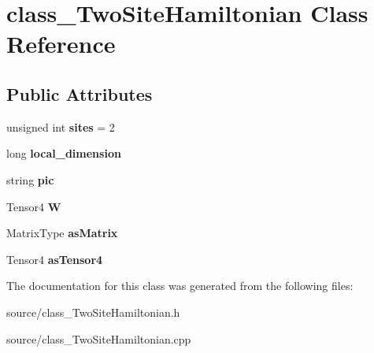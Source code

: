 \hypertarget{classclass___two_site_hamiltonian}{}\section{class\+\_\+\+Two\+Site\+Hamiltonian Class Reference}
\label{classclass___two_site_hamiltonian}
\subsection*{Public Attributes}
\begin{DoxyCompactItemize}
\item 
unsigned int {\bfseries sites} = 2\hypertarget{classclass___two_site_hamiltonian_a335dfa2f3998b5ae32ea04fbe7fd9bd7}{}\label{classclass___two_site_hamiltonian_a335dfa2f3998b5ae32ea04fbe7fd9bd7}

\item 
long {\bfseries local\+\_\+dimension}\hypertarget{classclass___two_site_hamiltonian_aeb12dabc056b052477430c47f8b1ebed}{}\label{classclass___two_site_hamiltonian_aeb12dabc056b052477430c47f8b1ebed}

\item 
string {\bfseries pic}\hypertarget{classclass___two_site_hamiltonian_a77f629e9366b73ddc2b76a0fad6bc904}{}\label{classclass___two_site_hamiltonian_a77f629e9366b73ddc2b76a0fad6bc904}

\item 
Tensor4 {\bfseries W}\hypertarget{classclass___two_site_hamiltonian_a30777e63cc96752d1dc3f09ffd21db89}{}\label{classclass___two_site_hamiltonian_a30777e63cc96752d1dc3f09ffd21db89}

\item 
Matrix\+Type {\bfseries as\+Matrix}\hypertarget{classclass___two_site_hamiltonian_a6b26bc09667db4b35706aba111e05f27}{}\label{classclass___two_site_hamiltonian_a6b26bc09667db4b35706aba111e05f27}

\item 
Tensor4 {\bfseries as\+Tensor4}\hypertarget{classclass___two_site_hamiltonian_a9252b45d845caeec34823fed4854ecc4}{}\label{classclass___two_site_hamiltonian_a9252b45d845caeec34823fed4854ecc4}

\end{DoxyCompactItemize}


The documentation for this class was generated from the following files\+:\begin{DoxyCompactItemize}
\item 
source/class\+\_\+\+Two\+Site\+Hamiltonian.\+h\item 
source/class\+\_\+\+Two\+Site\+Hamiltonian.\+cpp\end{DoxyCompactItemize}
